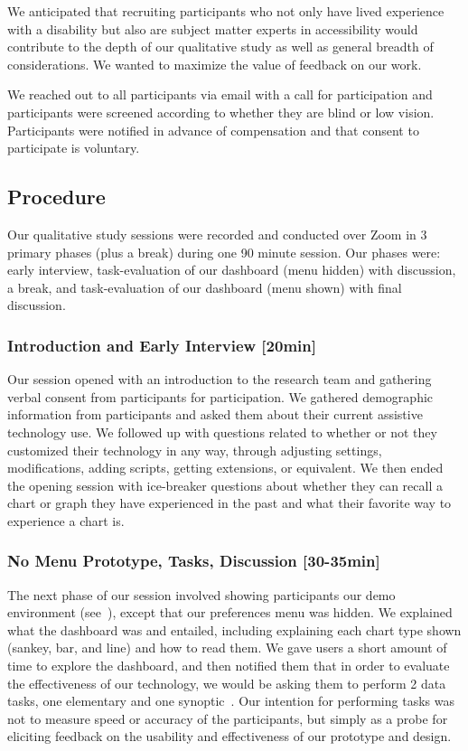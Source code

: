 \documentclass[12pt]{cmuthesis}
\begin{document}
We anticipated that recruiting participants who not only have lived experience with a disability but also are subject matter experts in accessibility would contribute to the depth of our qualitative study as well as general breadth of considerations. We wanted to maximize the value of feedback on our work.

We reached out to all participants via email with a call for participation and participants were screened according to whether they are blind or low vision. Participants were notified in advance of compensation and that consent to participate is voluntary.

\subsection{Procedure}
Our qualitative study sessions were recorded and conducted over Zoom in 3 primary phases (plus a break) during one 90 minute session. Our phases were: early interview, task-evaluation of our dashboard (menu hidden) with discussion, a break, and task-evaluation of our dashboard (menu shown) with final discussion.

\subsubsection{Introduction and Early Interview [20min]}
Our session opened with an introduction to the research team and gathering verbal consent from participants for participation. We gathered demographic information from participants and asked them about their current assistive technology use. We followed up with questions related to whether or not they customized their technology in any way, through adjusting settings, modifications, adding scripts, getting extensions, or equivalent. We then ended the opening session with ice-breaker questions about whether they can recall a chart or graph they have experienced in the past and what their favorite way to experience a chart is.

\subsubsection{No Menu Prototype, Tasks, Discussion [30-35min]}
The next phase of our session involved showing participants our demo environment (see~), except that our preferences menu was hidden. We explained what the dashboard was and entailed, including explaining each chart type shown (sankey, bar, and line) and how to read them. We gave users a short amount of time to explore the dashboard, and then notified them that in order to evaluate the effectiveness of our technology, we would be asking them to perform 2 data tasks, one elementary and one synoptic~\cite{Aigner}. Our intention for performing tasks was not to measure speed or accuracy of the participants, but simply as a probe for eliciting feedback on the usability and effectiveness of our prototype and design.
\end{document}
